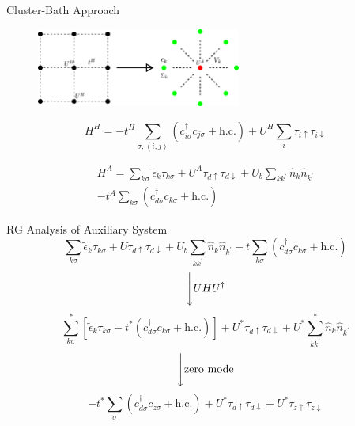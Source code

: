 \documentclass[aspectratio=169]{beamer}
\begin{document}
\begin{frame}{Cluster-Bath Approach}
	\begin{figure}[htpb]
		\centering
		\includegraphics[width=0.6\textwidth]{./cluster-bath.png}
	\end{figure}

\begin{minipage}{0.45\textwidth}
	\[H^H = -t^H\sum_{\sigma,\left<i,j \right>}\left(c^\dagger_{i\sigma} c_{j\sigma} + \text{h.c.}\right) + U^H\sum_i \tau_{i \uparrow} \tau_{i \downarrow}\]
\end{minipage}
\begin{minipage}{0.53\textwidth}
	\begin{equation*}\begin{aligned}
H^A = \sum_{k\sigma}\tilde\epsilon_k\tau_{k\sigma} + U^A \tau_{d \uparrow} \tau_{d \downarrow} + U_b \sum_{kk^\prime}\hat n_k \hat n_{k^\prime}\\
-t^A\sum_{k\sigma}\left(c^\dagger_{d\sigma}c_{k\sigma} + \text{h.c.}\right)
\end{aligned}\end{equation*}
\end{minipage}
\end{frame}
\begin{frame}{RG Analysis of Auxiliary System}
	\[\sum_{k\sigma}\tilde\epsilon_k\tau_{k\sigma} + U \tau_{d \uparrow} \tau_{d \downarrow} + U_b \sum_{kk^\prime}\hat n_k \hat n_{k^\prime} -t\sum_{k\sigma}\left(c^\dagger_{d\sigma}c_{k\sigma} + \text{h.c.}\right)\]
	\[\Bigg\downarrow U H U^\dagger\]
	\[\sum_{k\sigma}^*\left[\tilde\epsilon_k\tau_{k\sigma} -{t}^*\left(c^\dagger_{d\sigma}c_{k\sigma} + \text{h.c.}\right)\right] + U^* \tau_{d \uparrow} \tau_{d \downarrow} + U^* \sum_{kk^\prime}^*\hat n_k \hat n_{k^\prime} \]
	\[\Bigg\downarrow \text{zero mode}\]
	\[-{t}^*\sum_{\sigma}\left(c^\dagger_{d\sigma}c_{z\sigma} + \text{h.c.}\right) + U^* \tau_{d \uparrow} \tau_{d \downarrow} + U^* \tau_{z \uparrow} \tau_{z \downarrow} \]
\end{frame}
\end{document}
